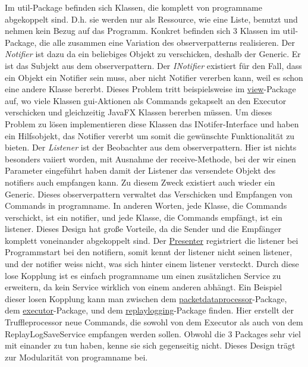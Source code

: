 \medskip
Im util-Package befinden sich Klassen, die komplett von \gls{programname} abgekoppelt
sind. D.h. sie werden nur als Ressource, wie eine Liste, benutzt und nehmen kein
Bezug auf das Programm.\newline
Konkret befinden sich 3 Klassen im util-Package, die alle zusammen eine
Variation des \gls{observerpattern}s realisieren. Der \textit{Notifier} ist dazu da
ein beliebiges Objekt zu verschicken, deshalb der Generic. Er ist das Subjekt aus
dem \gls{observerpattern}.
\newline
\newline
Der \textit{INotifier} existiert für den Fall, dass ein
Objekt ein Notifier sein muss, aber nicht Notifier vererben kann, weil es
schon eine andere Klasse bererbt. Dieses Problem tritt beispielsweise im
\hyperref[subsec:view]{view}-Package auf, wo viele Klassen \gls{gui}-Aktionen als Commands
gekapselt an den Executor verschicken und gleichzeitig JavaFX Klassen bererben müssen.
Um dieses Problem zu lösen implementieren diese Klassen das INotifer-Interface
und haben ein Hilfsobjekt, das Notifier vererbt um somit die gewünschte Funktionalität zu
bieten.
\newline
\newline
Der \textit{Listener} ist der Beobachter aus dem \gls{observerpattern}. Hier ist nichts
besonders vaiiert worden, mit Ausnahme der receive-Methode, bei der wir einen Parameter eingeführt
haben damit der Listener das versendete Objekt des \gls{notifier}s auch empfangen kann.
Zu diesem Zweck existiert auch wieder ein Generic.
\newline
\newline
Dieses \gls{observerpattern} verwaltet das Verschicken und Empfangen von Commands in
\gls{programname}. In anderen Worten, jede Klasse, die Commands verschickt, ist ein
\gls{notifier}, und jede Klasse, die Commands empfängt, ist ein \gls{listener}. Dieses Design
hat große Vorteile, da die Sender und die Empfänger komplett voneinander abgekoppelt
sind. Der \hyperref[subsec:presenter]{Presenter} registriert die \gls{listener} bei Programmstart
bei den \gls{notifier}n, somit kennt der \gls{listener} nicht seinen \gls{listener}, und der
\gls{notifier} weiss nicht, was sich hinter einem \gls{listener} versteckt. Durch diese lose
Kopplung ist es einfach \gls{programname} um einen zusätzlichen Service zu erweitern,
da kein Service wirklich von einem anderen abhängt.
\newline
\newline
Ein Beispiel dieser losen Kopplung kann man zwischen dem
\hyperref[subsubsec:packetdataprocessor]{packetdataprocessor}-Package, dem
\hyperref[subsubsec:executor]{executor}-Package, und dem
\hyperref[subsubsec:replaylogging]{replaylogging}-Package finden. Hier erstellt
der Truffleprocessor neue Commands, die sowohl von dem Executor als auch von dem
ReplayLogSaveService empfangen werden sollen. Obwohl die 3 Packages sehr viel
mit einander zu tun haben, kenne sie sich gegenseitig nicht. Dieses Design
trägt zur Modularität von \gls{programname} bei.